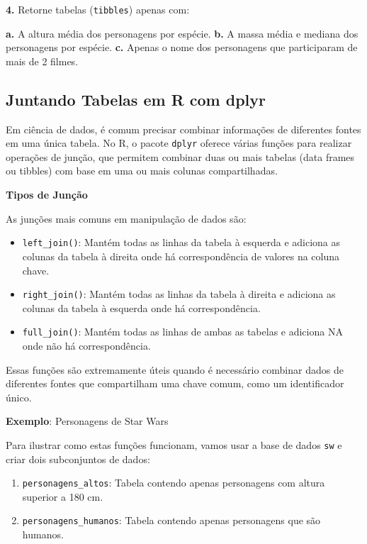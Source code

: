 \documentclass[
]{book}
\providecommand{\tightlist}{%
  \setlength{\itemsep}{0pt}\setlength{\parskip}{0pt}}
\begin{document}
\textbf{4.} Retorne tabelas (\texttt{tibbles}) apenas com:

\textbf{a.} A altura média dos personagens por espécie. \textbf{b.} A massa média
e mediana dos personagens por espécie. \textbf{c.} Apenas o nome dos
personagens que participaram de mais de 2 filmes.

\subsection{Juntando Tabelas em R com dplyr}\label{juntando-tabelas-em-r-com-dplyr}

Em ciência de dados, é comum precisar combinar informações de diferentes
fontes em uma única tabela. No R, o pacote \texttt{dplyr} oferece várias
funções para realizar operações de junção, que permitem combinar duas ou
mais tabelas (data frames ou tibbles) com base em uma ou mais colunas
compartilhadas.

\textbf{Tipos de Junção}

As junções mais comuns em manipulação de dados são:

\begin{itemize}
\tightlist
\item
  \texttt{left\_join()}: Mantém todas as linhas da tabela à esquerda e
  adiciona as colunas da tabela à direita onde há correspondência de
  valores na coluna chave.
\item
  \texttt{right\_join()}: Mantém todas as linhas da tabela à direita e
  adiciona as colunas da tabela à esquerda onde há correspondência.
\item
  \texttt{full\_join()}: Mantém todas as linhas de ambas as tabelas e adiciona
  NA onde não há correspondência.
\end{itemize}

Essas funções são extremamente úteis quando é necessário combinar dados
de diferentes fontes que compartilham uma chave comum, como um
identificador único.

\textbf{Exemplo}: Personagens de Star Wars

Para ilustrar como estas funções funcionam, vamos usar a base de dados
\texttt{sw} e criar dois subconjuntos de dados:

\begin{enumerate}
\def\labelenumi{\arabic{enumi}.}
\tightlist
\item
  \texttt{personagens\_altos}: Tabela contendo apenas personagens com altura
  superior a 180 cm.
\item
  \texttt{personagens\_humanos}: Tabela contendo apenas personagens que são
  humanos.
\end{enumerate}
\end{document}
